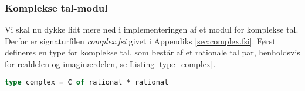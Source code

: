 





\subsubsection{Komplekse tal-modul}
Vi skal nu dykke lidt mere ned i implementeringen af et modul for komplekse tal. Derfor er signaturfilen \textit{complex.fsi} givet i Appendiks \ref{sec:complex.fsi}. Først defineres en type for komplekse tal, som består af et rationale tal par, henholdsvis for realdelen og imaginærdelen, se Listing \ref{type_complex}.

\begin{lstlisting}[language={FSharp}, 
    label={type_complex},
    caption={Typen for komplekse tal}]
type complex = C of rational * rational
\end{lstlisting}

